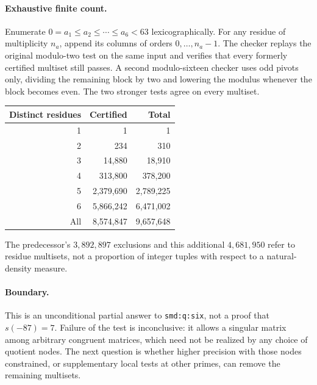 \documentclass[11pt]{article}
\begin{document}
\paragraph{Exhaustive finite count.}
Enumerate $0=a_1\le a_2\le\cdots\le a_6<63$ lexicographically.
For any residue of multiplicity $n_a$, append its columns of
orders $0,\ldots,n_a-1$. The checker replays the original
modulo-two test on the same input and verifies that every formerly
certified multiset still passes. A second modulo-sixteen checker
uses odd pivots only, dividing the remaining block by two and
lowering the modulus whenever the block becomes even.
The two stronger tests agree on every multiset.
\begin{center}
\begin{tabular}{rrr}
\toprule
Distinct residues & Certified & Total\\
\midrule
1 & 1 & 1\\
2 & 234 & 310\\
3 & 14,880 & 18,910\\
4 & 313,800 & 378,200\\
5 & 2,379,690 & 2,789,225\\
6 & 5,866,242 & 6,471,002\\
\midrule
All & 8,574,847 & 9,657,648\\
\bottomrule
\end{tabular}
\end{center}
The predecessor's $3{,}892{,}897$ exclusions and this additional
$4{,}681{,}950$ refer to residue multisets, not a proportion of
integer tuples with respect to a natural-density measure.

\paragraph{Boundary.}
This is an unconditional partial answer to \texttt{smd:q:six},
not a proof that $s(-87)=7$. Failure of the test is inconclusive:
it allows a singular matrix among arbitrary congruent matrices, which
need not be realized by any choice of quotient nodes. The next
question is whether higher precision with those nodes constrained,
or supplementary local tests at other primes, can remove the
remaining multisets.
\end{document}
